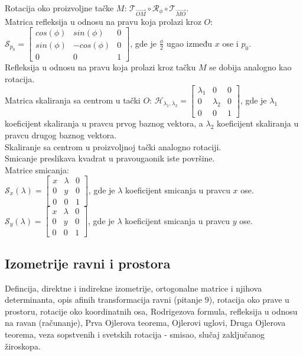 \documentclass[12pt]{article}
\newcommand{\vek}[1]{\overrightarrow{#1}}
\begin{document}
Rotacija oko proizvoljne tačke $M$:
$\mathcal{T}_{\vek{OM}}\circ\mathcal{R}_\phi\circ\mathcal{T}_{\vek{MO}}$.\\
Matrica refleksija u odnosu na pravu koja prolazi kroz $O$:
$\mathcal{S}_{p_0}=\begin{bmatrix}
        cos(\phi) & sin(\phi)  & 0 \\
        sin(\phi) & -cos(\phi) & 0 \\
        0         & 0          & 1
    \end{bmatrix}$, gde je $\frac{\phi}{2}$ ugao između $x$ ose i $p_0$.\\
Refleksija u odnosu na pravu koja prolazi kroz tačku $M$ se dobija analogno kao rotacija.\\
Matrica skaliranja sa centrom u tački $O$:
$\mathcal{H}_{\lambda_1,\lambda_2}=\begin{bmatrix}
        \lambda_1 & 0         & 0 \\
        0         & \lambda_2 & 0 \\
        0         & 0         & 1
    \end{bmatrix}$, gde je $\lambda_1$ koeficijent skaliranja u pravcu
prvog baznog vektora, a $\lambda_2$ koeficijent skaliranja u pravcu
drugog baznog vektora.\\
Skaliranje sa centrom u proizvoljnoj tački analogno rotaciji.\\
Smicanje preslikava kvadrat u pravougaonik iste površine.\\
Matrice smicanja:\\
$\mathcal{S}_x(\lambda)=\begin{bmatrix}
        x & \lambda & 0 \\
        0 & y       & 0 \\
        0 & 0       & 1
    \end{bmatrix}$, gde je $\lambda$ koeficijent smicanja u pravcu $x$ ose.\\
$\mathcal{S}_y(\lambda)=\begin{bmatrix}
        x & \lambda & 0 \\
        0 & y       & 0 \\
        0 & 0       & 1
    \end{bmatrix}$, gde je $\lambda$ koeficijent smicanja u pravcu $y$ ose.


\subsection{Izometrije ravni i prostora}
Defincija, direktne i indirekne izometrije, ortogonalne
matrice i njihova determinanta, opis afinih transformacija
ravni (pitanje 9), rotacija oko prave u prostoru, rotacije
oko koordinatnih osa, Rodrigezova formula, refleksija u
odnosu na ravan (računanje), Prva Ojlerova teorema,
Ojlerovi uglovi, Druga Ojlerova teorema, veza sopstvenih i
svetskih rotacija - smisao, slučaj zaključanog žiroskopa.\par
\end{document}
